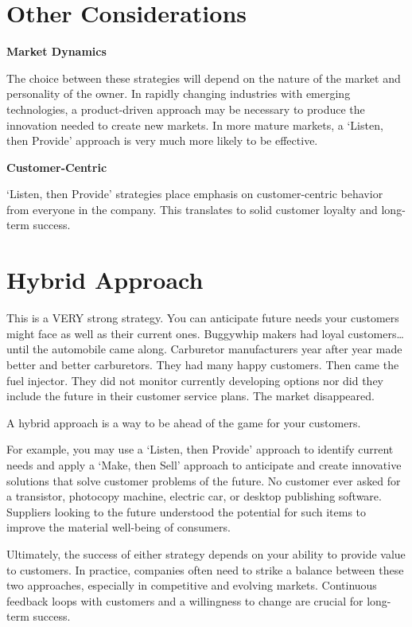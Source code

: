 \documentclass[
]{book}
\begin{document}
\hypertarget{other-considerations}{%
\section{\texorpdfstring{\textbf{Other Considerations}}{Other Considerations}}\label{other-considerations}}

\textbf{Market Dynamics}

The choice between these strategies will depend on the nature of the market and personality of the owner. In rapidly changing industries with emerging technologies, a product-driven approach may be necessary to produce the innovation needed to create new markets. In more mature markets, a {`Listen, then Provide'} approach is very much more likely to be effective.

\textbf{Customer-Centric}

{`Listen, then Provide'} strategies place emphasis on customer-centric behavior from everyone in the company. This translates to solid customer loyalty and long-term success.

\hypertarget{hybrid-approach}{%
\section{\texorpdfstring{\textbf{Hybrid Approach}}{Hybrid Approach}}\label{hybrid-approach}}

This is a VERY strong strategy. You can anticipate future needs your customers might face as well as their current ones. Buggywhip makers had loyal customers\ldots until the automobile came along. Carburetor manufacturers year after year made better and better carburetors. They had many happy customers. Then came the fuel injector. They did not monitor currently developing options nor did they include the future in their customer service plans. The market disappeared.

A hybrid approach is a way to be ahead of the game for your customers.

For example, you may use a {`Listen, then Provide'} approach to identify current needs and apply a { `Make, then Sell'} approach to anticipate and create innovative solutions that solve customer problems of the future. No customer ever asked for a transistor, photocopy machine, electric car, or desktop publishing software. Suppliers looking to the future understood the potential for such items to improve the material well-being of consumers.

Ultimately, the success of either strategy depends on your ability to provide value to customers. In practice, companies often need to strike a balance between these two approaches, especially in competitive and evolving markets. Continuous feedback loops with customers and a willingness to change are crucial for long-term success.
\end{document}
